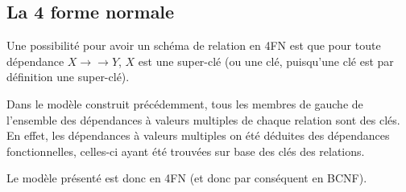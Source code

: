 \documentclass[a4paper, 12pt]{article}
\begin{document}
	\subsection{La 4\ieme{} forme normale}
	Une possibilité pour avoir un schéma de relation en 4FN est que pour toute dépendance $X \rightarrow\rightarrow Y$, $X$ est une super-clé (ou une clé, puisqu'une clé est par définition une super-clé).\par
	Dans le modèle construit précédemment, tous les membres de gauche de l'ensemble des dépendances à valeurs multiples de chaque relation sont des clés. En effet, les dépendances à valeurs multiples on été déduites des dépendances fonctionnelles, celles-ci ayant été trouvées sur base des clés des relations.\par
	Le modèle présenté est donc en 4FN (et donc par conséquent en BCNF).
\end{document}
